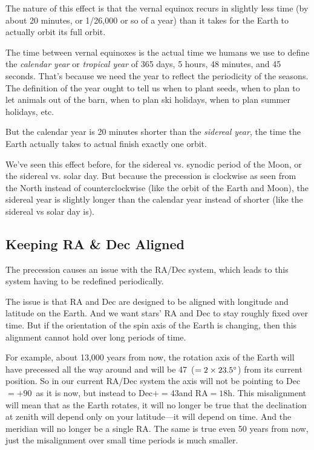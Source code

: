 \documentclass[12pt, preprint]{aastex}
\begin{document}
The nature of this effect is that the vernal equinox recurs in
slightly less time (by about 20 minutes, or 1/26,000 or so of a year)
than it takes for the Earth to actually orbit its full orbit.

The time between vernal equinoxes is the actual time we humans we use
to define the {\it calendar year} or {\it tropical year} of 365 days,
5 hours, 48 minutes, and 45 seconds. That's because we need the year
to reflect the periodicity of the seasons. The definition of the year
ought to tell us when to plant seeds, when to plan to let animals out
of the barn, when to plan ski holidays, when to plan summer holidays,
etc.

But the calendar year is 20 minutes shorter than the {\it sidereal
  year}, the time the Earth actually takes to actual finish exactly
one orbit.

We've seen this effect before, for the sidereal vs. synodic period of
the Moon, or the sidereal vs. solar day. But because the precession is
clockwise as seen from the North instead of counterclockwise (like the
orbit of the Earth and Moon), the sidereal year is slightly longer
than the calendar year instead of shorter (like the sidereal vs solar
day is). 

\subsection{Keeping RA \& Dec Aligned}

The precession causes an issue with the RA/Dec system, which leads to
this system having to be redefined periodically.

The issue is that RA and Dec are designed to be aligned with longitude
and latitude on the Earth. And we want stars' RA and Dec to stay
roughly fixed over time. But if the orientation of the spin axis of
the Earth is changing, then this alignment cannot hold over long
periods of time. 

For example, about 13,000 years from now, the rotation axis of the
Earth will have precessed all the way around and will be
47\degree\ ($=2\times 23.5{}^\circ$) from its current position. So in
our current RA/Dec system the axis will not be pointing to
Dec$=+90$\degree\ as it is now, but instead to Dec$+=43$\degree and
RA$=18$h. This misalignment will mean that as the Earth rotates, it
will no longer be true that the declination at zenith will depend only
on your latitude---it will depend on time. And the meridian will no
longer be a single RA.  The same is true even 50 years from now, just
the misalignment over small time periods is much smaller.
\end{document}
